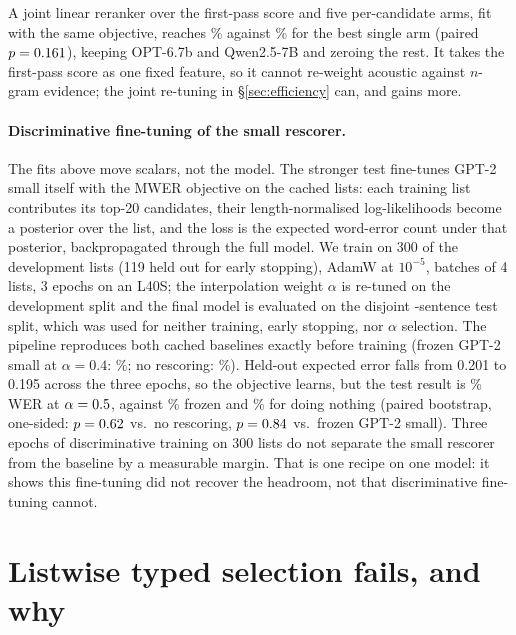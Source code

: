 \documentclass[11pt]{article}
\begin{document}
A joint linear reranker over the first-pass score and five per-candidate arms, fit with
the same objective, reaches \mwerMulti\% against \werOpt\% for the best single arm
(paired $p=0.161$), keeping OPT-6.7b and Qwen2.5-7B and zeroing the rest. It takes
the first-pass score as one fixed feature, so it cannot re-weight acoustic against
$n$-gram evidence; the joint re-tuning in \S\ref{sec:efficiency} can, and gains more.

\paragraph{Discriminative fine-tuning of the small rescorer.} The fits above move
scalars, not the model. The stronger test fine-tunes GPT-2 small itself with the MWER
objective on the cached lists: each training list contributes its top-20 candidates,
their length-normalised log-likelihoods become a posterior over the list, and the loss
is the expected word-error count under that posterior, backpropagated through the full
model. We train on 300 of the \nDev{} development lists (119 held out for early
stopping), AdamW at $10^{-5}$, batches of 4 lists, 3 epochs on an L40S; the
interpolation weight $\alpha$ is re-tuned on the development split and the final model
is evaluated on the disjoint \nTest{}-sentence test split, which was used for neither
training, early stopping, nor $\alpha$ selection. The pipeline reproduces both cached
baselines exactly before training (frozen GPT-2 small at $\alpha=0.4$: \werGptSmall\%;
no rescoring: \werNone\%). Held-out expected error falls from 0.201 to 0.195 across the
three epochs, so the objective learns, but the test result is \mwerSmallWer\% WER at
$\alpha=0.5$, against \werGptSmall\% frozen and \werNone\% for doing
nothing (paired bootstrap, one-sided: $p=0.62$ vs.\ no rescoring,
$p=0.84$ vs.\ frozen GPT-2 small). Three epochs of discriminative training on
300 lists do not separate the small rescorer from the baseline by a measurable margin.
That is one recipe on one model: it shows this fine-tuning did not recover the headroom,
not that discriminative fine-tuning cannot.

\section{Listwise typed selection fails, and why}
\label{sec:typed}

\begin{table}[t]
\centering\small

\caption{Diagnostic for the typed arms over all \nLists{} lists (100-best generation; mean
38.7 candidates per list). ``Labels used'' counts distinct candidate labels ever selected;
``truth selected'' is how often the arm's own argmax is correct, before combination. Label
A is the decoder's top candidate. The last column conditions on deviating from it: only
Jev's deviations carry signal.}
\label{tab:collapse}
\end{table}
\end{document}
